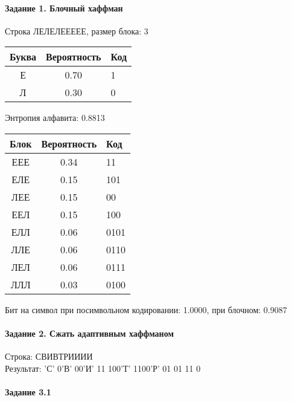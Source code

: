 \documentclass[a4paper, 12pt]{article}
\begin{document}
\paragraph{Задание 1. Блочный хаффман \\}

Строка ЛЕЛЕЛЕЕЕЕЕ, размер блока: 3
\begin{center}
 \begin{tabular}{ |c|c|l| } 
  \hline
     Буква & Вероятность & Код\\ \hline
Е & 0.70 & 1\\\hline
Л & 0.30 & 0
\\ \hline \end{tabular}
\end{center}
Энтропия алфавита: 0.8813
\begin{center}
 \begin{tabular}{ |c|c|l| } 
  \hline
     Блок & Вероятность & Код\\ \hline
ЕЕЕ & 0.34 & 11\\\hline
ЕЛЕ & 0.15 & 101\\\hline
ЛЕЕ & 0.15 & 00\\\hline
ЕЕЛ & 0.15 & 100\\\hline
ЕЛЛ & 0.06 & 0101\\\hline
ЛЛЕ & 0.06 & 0110\\\hline
ЛЕЛ & 0.06 & 0111\\\hline
ЛЛЛ & 0.03 & 0100
\\ \hline \end{tabular}
\end{center}
Бит на символ при посимвольном кодировании: 1.0000, при блочном: 0.9087


\pagebreak
\paragraph{Задание 2. Сжать адаптивным хаффманом\\}

Строка: 
СВИВТРИИИИ\\
Результат: 'С' 0'В' 00'И' 11 100'Т' 1100'Р' 01 01 11 0










\pagebreak
\paragraph{Задание 3.1}
\end{document}
